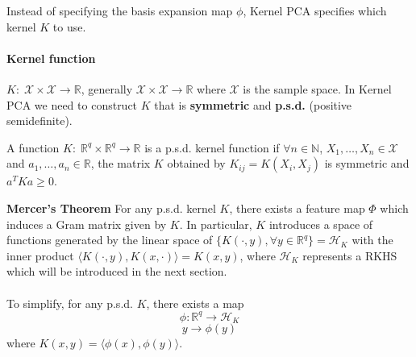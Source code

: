 \documentclass[12pt]{book}
\theoremstyle{definition}
\theoremstyle{remark}
\newcommand{\R}{\mathbb{R}}
\begin{document}
Instead of specifying the basis expansion map $\phi$, Kernel PCA specifies which kernel $K$ to use.

\paragraph{Kernel function} $K: \; \mathcal{X} \times \mathcal{X} \rightarrow \R$, generally $\mathcal{X} \times \mathcal{X} \rightarrow\R$ where $\mathcal{X}$ is the sample space. In Kernel PCA we need to construct $K$ that is \textbf{symmetric} and \textbf{p.s.d.} (positive semidefinite).\\


\begin{notionbox}[p.s.d. Kernel]
    A function $K: \; \R^q \times \R^q \rightarrow \R$ is a p.s.d. kernel function if $\forall n\in \mathbb{N}$, $X_1, \dots, X_n\in \mathcal{X}$ and $a_1,\dots, a_n\in \R$, the matrix $K$ obtained by $K_{ij} = K(X_i,X_j)$ is symmetric and $a^TKa \ge 0$.
\end{notionbox}



\textbf{Mercer's Theorem}
For any p.s.d. kernel $K$, there exists a feature map $\Phi$ which induces a Gram matrix given by $K$. In particular, $K$ introduces a space of functions generated by the linear space of $\{K(\cdot, y), \forall y \in \R^q\} = \mathcal{H}_K$ with the inner product $\langle K(\cdot,y),K(x,\cdot)\rangle = K(x,y)$, where $\mathcal{H}_K$ represents a RKHS which will be introduced in the next section.\\
\\

To simplify, for any p.s.d. $K$, there exists a map
\[\phi: \R^q \rightarrow \mathcal{H}_K\]
\[y\rightarrow \phi(y)\]
where $K(x,y) = \langle \phi(x), \phi(y) \rangle$.\\
\\
\end{document}
